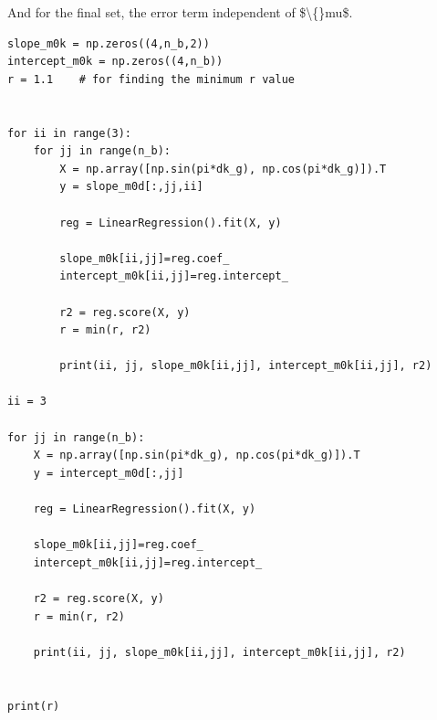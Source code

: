 \documentclass{article}
\begin{document}
And for the final set, the error term independent of \$\textbackslash\{\}mu\$.

\begin{lstlisting}
slope_m0k = np.zeros((4,n_b,2))
intercept_m0k = np.zeros((4,n_b))
r = 1.1    # for finding the minimum r value


for ii in range(3):
    for jj in range(n_b):
        X = np.array([np.sin(pi*dk_g), np.cos(pi*dk_g)]).T
        y = slope_m0d[:,jj,ii]

        reg = LinearRegression().fit(X, y)

        slope_m0k[ii,jj]=reg.coef_
        intercept_m0k[ii,jj]=reg.intercept_

        r2 = reg.score(X, y)
        r = min(r, r2)

        print(ii, jj, slope_m0k[ii,jj], intercept_m0k[ii,jj], r2)

ii = 3

for jj in range(n_b):
    X = np.array([np.sin(pi*dk_g), np.cos(pi*dk_g)]).T
    y = intercept_m0d[:,jj]

    reg = LinearRegression().fit(X, y)

    slope_m0k[ii,jj]=reg.coef_
    intercept_m0k[ii,jj]=reg.intercept_

    r2 = reg.score(X, y)
    r = min(r, r2)

    print(ii, jj, slope_m0k[ii,jj], intercept_m0k[ii,jj], r2)


print(r)\end{lstlisting}
\end{document}
